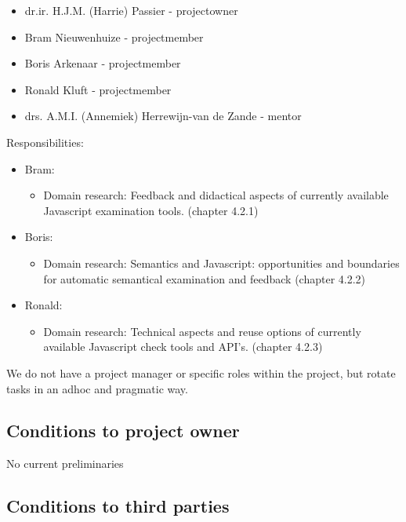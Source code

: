 \documentclass{article}
\begin{document}
\begin{itemize}
  \item dr.ir. H.J.M. (Harrie) Passier - projectowner
  \item Bram Nieuwenhuize - projectmember
  \item Boris Arkenaar - projectmember
  \item Ronald Kluft - projectmember
  \item drs. A.M.I. (Annemiek) Herrewijn-van de Zande - mentor
\end{itemize}

Responsibilities:
\begin{itemize}
  \item Bram: 
	\begin{itemize}
	\item Domain research: Feedback and didactical aspects of currently available Javascript examination tools. (chapter 4.2.1)
	\end{itemize}
  \item Boris:
	\begin{itemize}
	\item Domain research: Semantics and Javascript: opportunities and boundaries for automatic semantical examination and feedback (chapter 4.2.2)
	\end{itemize}
  \item Ronald:
	\begin{itemize}
	\item Domain research: Technical aspects and reuse options of currently available Javascript check tools and API's. (chapter 4.2.3)
	\end{itemize}
\end{itemize}

We do not have a project manager or specific roles within the project, but rotate tasks in an adhoc and pragmatic way.

\subsection{Conditions to project owner}

No current preliminaries

\subsection{Conditions to third parties}
\end{document}
